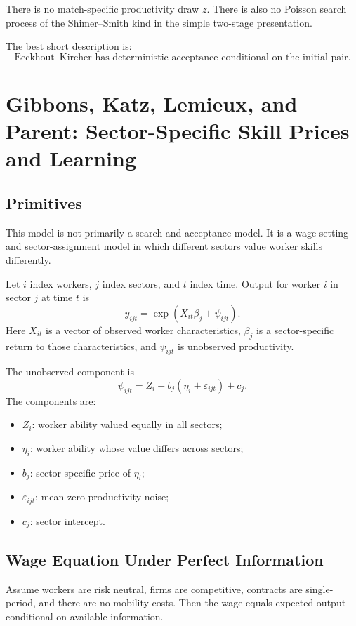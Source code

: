 \documentclass[11pt]{article}
\newcommand{\1}{\mathbf{1}}
\begin{document}
There is no match-specific productivity draw $z$. There is also no Poisson search process of the Shimer--Smith kind in the simple two-stage presentation.

The best short description is:
\[
\boxed{\text{Eeckhout--Kircher has deterministic acceptance conditional on the initial pair.}}
\]

\section{Gibbons, Katz, Lemieux, and Parent: Sector-Specific Skill Prices and Learning}

\subsection{Primitives}

This model is not primarily a search-and-acceptance model. It is a wage-setting and sector-assignment model in which different sectors value worker skills differently.

Let $i$ index workers, $j$ index sectors, and $t$ index time. Output for worker $i$ in sector $j$ at time $t$ is
\[
y_{ijt}
=
\exp\left(X_{it}\beta_j+\psi_{ijt}\right).
\]
Here $X_{it}$ is a vector of observed worker characteristics, $\beta_j$ is a sector-specific return to those characteristics, and $\psi_{ijt}$ is unobserved productivity.

The unobserved component is
\[
\psi_{ijt}
=
Z_i+b_j(\eta_i+\varepsilon_{ijt})+c_j.
\]
The components are:
\begin{itemize}
    \item $Z_i$: worker ability valued equally in all sectors;
    \item $\eta_i$: worker ability whose value differs across sectors;
    \item $b_j$: sector-specific price of $\eta_i$;
    \item $\varepsilon_{ijt}$: mean-zero productivity noise;
    \item $c_j$: sector intercept.
\end{itemize}

\subsection{Wage Equation Under Perfect Information}

Assume workers are risk neutral, firms are competitive, contracts are single-period, and there are no mobility costs. Then the wage equals expected output conditional on available information.
\end{document}
